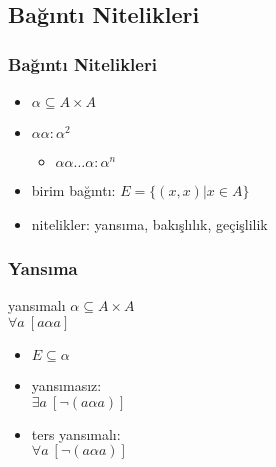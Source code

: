 \documentclass[dvipsnames]{beamer}
\theoremstyle{definition}
\theoremstyle{example}
\theoremstyle{plain}
\begin{document}
\subsection{Bağıntı Nitelikleri}

\begin{frame}
  \frametitle{Bağıntı Nitelikleri}

  \begin{itemize}
    \item $\alpha \subseteq A \times A$

    \pause
    \medskip
    \item $\alpha \alpha: \alpha^2$
    \begin{itemize}
      \item $\alpha \alpha \dots \alpha: \alpha^n$
    \end{itemize}

    \pause
    \medskip
    \item \alert{birim bağıntı}: $E = \{(x,x) | x \in A\}$

    \pause
    \medskip
    \item nitelikler: yansıma, bakışlılık, geçişlilik
  \end{itemize}
\end{frame}

\begin{frame}
  \frametitle{Yansıma}

  \begin{block}{yansımalı}
    $\alpha \subseteq A \times A$\\
    $\forall a~[a \alpha a]$
  \end{block}

  \pause
  \begin{itemize}
    \item $E \subseteq \alpha$

    \pause
    \medskip
    \item yansımasız:\\
      $\exists a~[\neg (a \alpha a)]$

    \pause
    \item ters yansımalı:\\
      $\forall a~[\neg (a \alpha a)]$
  \end{itemize}
\end{frame}
\end{document}
